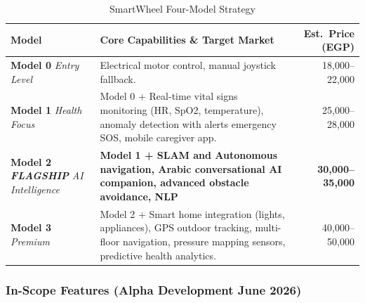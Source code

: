 \documentclass[12pt,a4paper]{report}
\renewcommand{\arraystretch}{1.45}
\renewcommand{\arraystretch}{1.3}
\begin{document}
\begin{table}[H]
\centering
\caption{SmartWheel Four-Model Strategy}
\label{tab:four_models}
{\renewcommand{\arraystretch}{1.8}
\begin{tabularx}{\textwidth}{@{}p{2.5cm}Xr@{}}
\toprule
\textbf{Model} & \textbf{Core Capabilities \& Target Market} & \textbf{Est.\ Price (EGP)} \\
\midrule
\textbf{Model 0} \newline \textit{Entry Level} &
Electrical motor control, manual joystick fallback. &
18,000--22,000 \\
\midrule
\textbf{Model 1} \newline \textit{Health Focus} &
Model 0 + Real-time vital signs monitoring (HR, SpO2, temperature), anomaly detection with alerts emergency SOS, mobile caregiver app. &
25,000--28,000 \\
\midrule
\rowcolor{lightgray}
\textbf{Model 2} \newline \textit{\textbf{FLAGSHIP}} \newline \textit{AI Intelligence} &
\textbf{Model 1 + SLAM and  Autonomous  navigation, Arabic conversational AI companion, advanced obstacle avoidance, NLP} &
\textbf{30,000--35,000} \\
\midrule
\textbf{Model 3} \newline \textit{Premium} &
Model 2 + Smart home integration (lights, appliances), GPS outdoor tracking, multi-floor navigation, pressure mapping sensors, predictive health analytics. &
40,000--50,000 \\
\bottomrule
\end{tabularx}}
\end{table}

\subsubsection{In-Scope Features (Alpha Development June 2026)}
\end{document}
